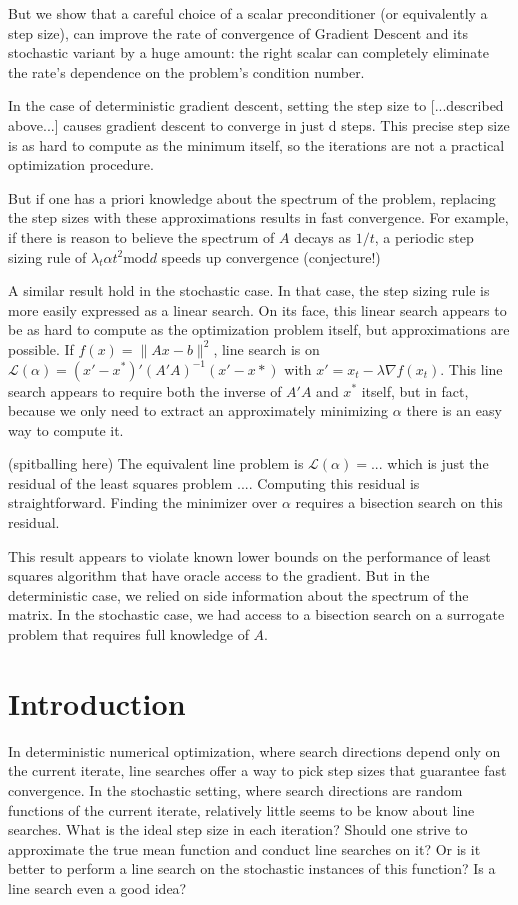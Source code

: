\documentclass{article}
\renewcommand{\L}{\mathcal{L}}
\begin{document}
But we show that a careful choice of a scalar preconditioner (or equivalently a step size), can improve the rate of convergence of Gradient Descent and its stochastic variant by a huge amount: the right scalar can completely eliminate the rate's dependence on the problem's condition number.

In the case of deterministic gradient descent, setting the step size to [...described above...] causes gradient descent to converge in just d steps. This precise step size is as hard to compute as the minimum itself, so the iterations are not a practical optimization procedure.

But if one has a priori knowledge about the spectrum of the problem,  replacing the step sizes with these approximations results in fast convergence. For example, if there is reason to believe the spectrum of $A$ decays as $1/t$, a periodic step sizing rule of $\lambda_t \alpha t^2 \text{mod} d$ speeds up convergence (conjecture!)

A similar result hold in the stochastic case. In that case, the step sizing rule is more easily expressed as a linear search. On its face, this linear search appears to be as hard to compute as the optimization problem itself, but approximations are possible. If $f(x) = \|Ax - b\|^2$, line search is on $\L(\alpha) = (x'-x^*)'\left(A'A\right)^{-1}(x'-x*)$ with $x'=x_t-\lambda \nabla f(x_t)$. This line search appears to require both the inverse of $A'A$ and $x^*$ itself, but in fact, because we only need to extract an approximately minimizing $\alpha$ there is an easy way to compute it.

(spitballing here) The equivalent line problem is $\L(\alpha) = ...$ which is just the residual of the least squares problem .... Computing this residual is straightforward. Finding the minimizer over $\alpha$ requires a bisection search on this residual.

This result appears to violate known lower bounds on the performance of least squares algorithm that have oracle access to the gradient. But in the deterministic case, we relied on side information about the spectrum of the matrix. In the stochastic case, we had access to a bisection search on a surrogate problem that requires full knowledge of $A$.

\section{Introduction}

In deterministic numerical optimization, where search directions depend only on the current iterate, line searches offer a way to pick step sizes that guarantee fast convergence. In the stochastic setting, where search directions are random functions of the current iterate, relatively little seems to be know about line searches. What is the ideal step size in each iteration? Should one strive to approximate the true mean function and conduct line searches on it? Or is it better to perform a line search on the stochastic instances of this function? Is a line search even a good idea?
\end{document}
